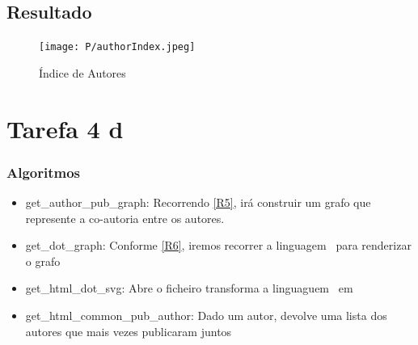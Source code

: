 \documentclass[11pt,a4paper]{report}
\begin{document}
\subsection{Resultado}
\begin{figure}[h]
\centering
\texttt{[image: P/authorIndex.jpeg]}
\caption{Índice de Autores}
\end{figure}

\section{Tarefa 4 d}
\subsubsection{Algoritmos}

\begin{itemize}
    \item  get\_author\_pub\_graph: Recorrendo  \ref{R5}, irá construir um grafo que represente a co-autoria entre os autores.
    \item  get\_dot\_graph: Conforme \ref{R6}, iremos recorrer a linguagem \dott \ para renderizar o grafo
    \item  get\_html\_dot\_svg: Abre o ficheiro transforma a linguaguem \dott \ em \htlm 
    \item  get\_html\_common\_pub\_author: Dado um autor, devolve uma lista dos autores que mais vezes  publicaram juntos

\end{itemize}
\end{document}
